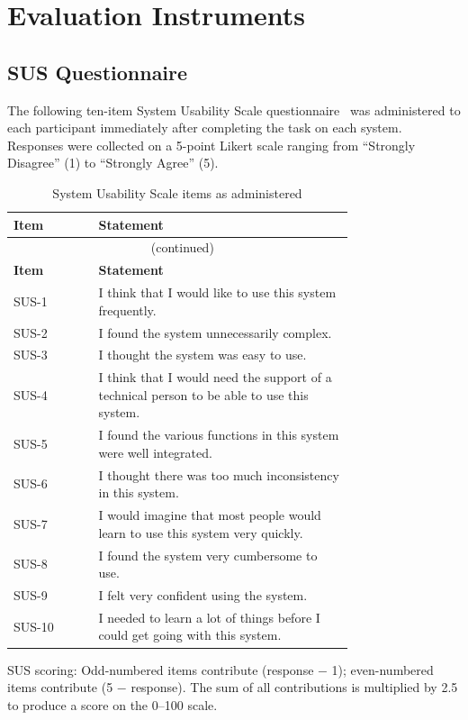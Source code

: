 \chapter{Evaluation Instruments}

\section{SUS Questionnaire}

The following ten-item System Usability Scale questionnaire~\cite{brooke1996}
was administered to each participant immediately after completing the task
on each system. Responses were collected on a 5-point Likert scale ranging
from ``Strongly Disagree'' (1) to ``Strongly Agree'' (5).

\begin{longtable}{lp{0.75\linewidth}}
  \caption{System Usability Scale items as administered} \label{tab:sus_items} \\
  \toprule
  \textbf{Item} & \textbf{Statement} \\
  \midrule
  \endfirsthead
  \multicolumn{2}{c}{\tablename\ \thetable{} (continued)} \\
  \toprule
  \textbf{Item} & \textbf{Statement} \\
  \midrule
  \endhead
  \bottomrule
  \endlastfoot
  SUS-1  & I think that I would like to use this system frequently. \\
  SUS-2  & I found the system unnecessarily complex. \\
  SUS-3  & I thought the system was easy to use. \\
  SUS-4  & I think that I would need the support of a technical person to be able to use this system. \\
  SUS-5  & I found the various functions in this system were well integrated. \\
  SUS-6  & I thought there was too much inconsistency in this system. \\
  SUS-7  & I would imagine that most people would learn to use this system very quickly. \\
  SUS-8  & I found the system very cumbersome to use. \\
  SUS-9  & I felt very confident using the system. \\
  SUS-10 & I needed to learn a lot of things before I could get going with this system. \\
\end{longtable}

\noindent
SUS scoring: Odd-numbered items contribute (response $-$ 1); even-numbered
items contribute (5 $-$ response). The sum of all contributions is
multiplied by 2.5 to produce a score on the 0--100 scale.

